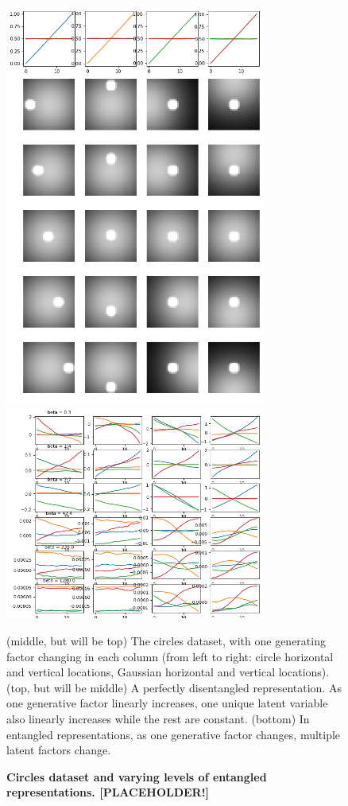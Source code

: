 \documentclass[10pt,letterpaper]{article}
\begin{document}
\begin{figure}%
     \includegraphics[width=3.375in]{entangle_analysis_supervised_anddata.png}
     \includegraphics[width=3.375in]{entangle_analysis_betaVAE.png}
  \caption{\textbf{Circles dataset and varying levels of entangled representations. [PLACEHOLDER!]}}{(middle, but will be top) The circles dataset, with one generating factor changing in each column (from left to right: circle horizontal and vertical locations, Gaussian horizontal and vertical locations). (top, but will be middle) A perfectly disentangled representation. As one generative factor linearly increases, one unique latent variable also linearly increases while the rest are constant. (bottom) In entangled representations, as one generative factor changes, multiple latent factors change.}
  \label{fig:dataset}
\end{figure}
\end{document}
